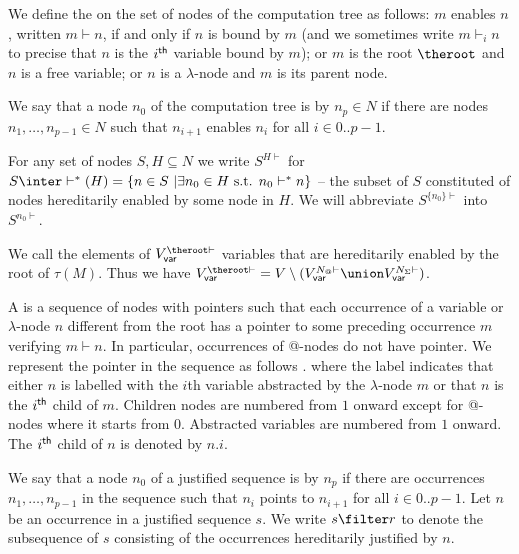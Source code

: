 We define the  on the set of nodes of the
computation tree as follows: $m$ enables $n$, written $m \vdash n$,
if and only if $n$ is bound by $m$ (and we sometimes write $m
\vdash_i n$ to precise that $n$ is the $i^{\sf th}$ variable bound
by $m$); or $m$ is the root $\theroot$ and $n$ is a free variable;
or $n$ is a $\lambda$-node and $m$ is its parent node.


We say that a node $n_0$ of the computation tree is
 by $n_p \in N$ if there are nodes
$n_1,\ldots, n_{p-1} \in N$ such that $n_{i+1}$ enables $n_{i}$ for
all $i\in 0..p-1$.

For any set of nodes $S, H \subseteq N$ we write $S^{H\vdash}$ for
$S \inter \vdash^*(H) = \{ n \in S \ | \exists n_0 \in H \mbox{ s.t.
}n_0  \vdash^* n \}$ -- the subset of $S$ constituted of nodes
hereditarily enabled by some node in $H$. We will abbreviate
$S^{\{n_0\}\vdash}$ into $S^{n_0\vdash}$.

We call  the elements of $V_{\sf
var}^{\theroot\vdash}$ \ie variables that are hereditarily enabled
by the root of $\tau(M)$. Thus we have $V_{\sf var}^{\theroot\vdash}
= V \setminus ( V_{\sf var}^{N_@\vdash} \union V_{\sf
var}^{N_\Sigma\vdash})$.

A  is a sequence of nodes with
pointers such that each occurrence of a variable or $\lambda$-node
$n$ different from the root has a pointer to some preceding
occurrence $m$ verifying $m \vdash n$. In particular, occurrences of
@-nodes do not have pointer. We represent the pointer in the
sequence as follows .
 where the label indicates that either $n$ is labelled with the $i$th variable
abstracted by the $\lambda$-node $m$ or that $n$ is the $i^{\sf th}$
child of $m$.  Children nodes are numbered from $1$ onward except for
@-nodes where it starts from $0$. Abstracted variables are numbered
from $1$ onward. The $i^{\sf th}$ child of $n$ is denoted by $n.i$.

We say that a node $n_0$ of a justified sequence is
 by $n_p$ if there are occurrences $n_1,
\ldots, n_{p-1}$ in the sequence such that $n_i$ points to $n_{i+1}$
for all $i\in 0..p-1$. Let $n$ be an occurrence in a justified
sequence $s$. We write $s \filter r$ to denote the subsequence of
$s$ consisting of the occurrences hereditarily justified by $n$.



